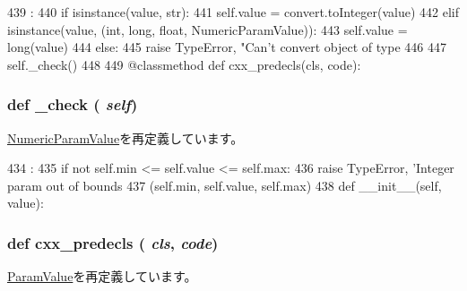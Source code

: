 \begin{DoxyCode}
439                              :
440         if isinstance(value, str):
441             self.value = convert.toInteger(value)
442         elif isinstance(value, (int, long, float, NumericParamValue)):
443             self.value = long(value)
444         else:
445             raise TypeError, "Can't convert object of type %
446                   %
447         self._check()
448 
449     @classmethod
    def cxx_predecls(cls, code):
\end{DoxyCode}
\hypertarget{classm5_1_1params_1_1CheckedInt_a5c5703e7ec69bc87b19ba3165760ea36}{
\subsubsection[{\_\-check}]{\setlength{\rightskip}{0pt plus 5cm}def \_\-check ( {\em self})}}
\label{classm5_1_1params_1_1CheckedInt_a5c5703e7ec69bc87b19ba3165760ea36}


\hyperlink{classm5_1_1params_1_1NumericParamValue_a5c5703e7ec69bc87b19ba3165760ea36}{NumericParamValue}を再定義しています。


\begin{DoxyCode}
434                     :
435         if not self.min <= self.value <= self.max:
436             raise TypeError, 'Integer param out of bounds %
437                   (self.min, self.value, self.max)
438 
    def __init__(self, value):
\end{DoxyCode}
\hypertarget{classm5_1_1params_1_1CheckedInt_a0b408a11a14bd1d770e28f71a6e14ab5}{
\subsubsection[{cxx\_\-predecls}]{\setlength{\rightskip}{0pt plus 5cm}def cxx\_\-predecls ( {\em cls}, \/   {\em code})}}
\label{classm5_1_1params_1_1CheckedInt_a0b408a11a14bd1d770e28f71a6e14ab5}


\hyperlink{classm5_1_1params_1_1ParamValue_a0b408a11a14bd1d770e28f71a6e14ab5}{ParamValue}を再定義しています。


